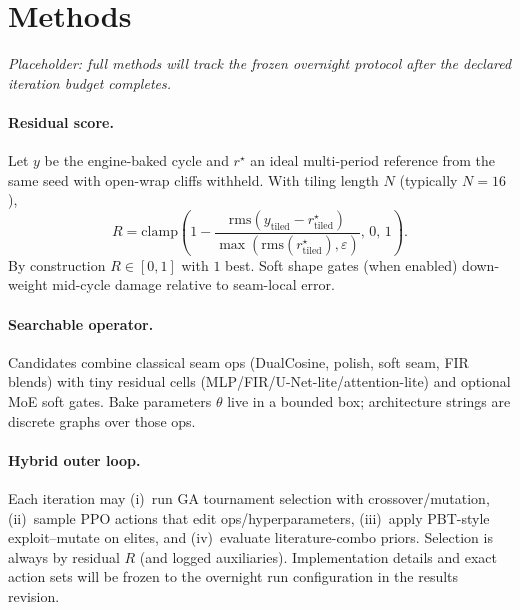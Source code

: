 \section{Methods}
\label{sec:methods}

\textit{Placeholder: full methods will track the frozen overnight protocol after the declared iteration budget completes.}

\paragraph{Residual score.}
Let $y$ be the engine-baked cycle and $r^{\star}$ an ideal multi-period reference from the same seed with open-wrap cliffs withheld.
With tiling length $N$ (typically $N{=}16$),
\begin{equation}
R=\mathrm{clamp}\!\left(1-\frac{\mathrm{rms}(y_{\mathrm{tiled}}-r^{\star}_{\mathrm{tiled}})}{\max(\mathrm{rms}(r^{\star}_{\mathrm{tiled}}),\varepsilon)},\,0,\,1\right).
\end{equation}
By construction $R\in[0,1]$ with $1$ best. Soft shape gates (when enabled) down-weight mid-cycle damage relative to seam-local error.

\paragraph{Searchable operator.}
Candidates combine classical seam ops (DualCosine, polish, soft seam, FIR blends) with tiny residual cells (MLP/FIR/U-Net-lite/attention-lite) and optional MoE soft gates.
Bake parameters $\theta$ live in a bounded box; architecture strings are discrete graphs over those ops.

\paragraph{Hybrid outer loop.}
Each iteration may (i)~run GA tournament selection with crossover/mutation, (ii)~sample PPO actions that edit ops/hyperparameters, (iii)~apply PBT-style exploit--mutate on elites, and (iv)~evaluate literature-combo priors.
Selection is always by residual $R$ (and logged auxiliaries). Implementation details and exact action sets will be frozen to the overnight run configuration in the results revision.
